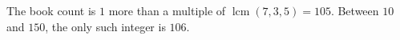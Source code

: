 The book count is $1$ more than a multiple of $\operatorname{lcm}(7,3,5)=105$. Between $10$ and $150$, the only such integer is $\boxed{106}$.
